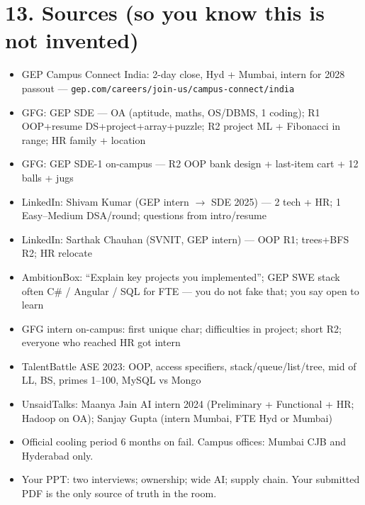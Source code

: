 \documentclass[a4paper,9.5pt]{extarticle}
\begin{document}
\section{13. Sources (so you know this is not invented)}
\begin{itemize}
  \item GEP Campus Connect India: 2-day close, Hyd + Mumbai, intern for 2028 passout --- \texttt{gep.com/careers/join-us/campus-connect/india}
  \item GFG: GEP SDE --- OA (aptitude, maths, OS/DBMS, 1 coding); R1 OOP+resume DS+project+array+puzzle; R2 project ML + Fibonacci in range; HR family + location
  \item GFG: GEP SDE-1 on-campus --- R2 OOP bank design + last-item cart + 12 balls + jugs
  \item LinkedIn: Shivam Kumar (GEP intern $\to$ SDE 2025) --- 2 tech + HR; 1 Easy--Medium DSA/round; questions from intro/resume
  \item LinkedIn: Sarthak Chauhan (SVNIT, GEP intern) --- OOP R1; trees+BFS R2; HR relocate
  \item AmbitionBox: ``Explain key projects you implemented''; GEP SWE stack often C\# / Angular / SQL for FTE --- you do not fake that; you say open to learn
  \item GFG intern on-campus: first unique char; difficulties in project; short R2; everyone who reached HR got intern
  \item TalentBattle ASE 2023: OOP, access specifiers, stack/queue/list/tree, mid of LL, BS, primes 1--100, MySQL vs Mongo
  \item UnsaidTalks: Maanya Jain AI intern 2024 (Preliminary + Functional + HR; Hadoop on OA); Sanjay Gupta (intern Mumbai, FTE Hyd or Mumbai)
  \item Official cooling period 6 months on fail. Campus offices: Mumbai CJB and Hyderabad only.
  \item Your PPT: two interviews; ownership; wide AI; supply chain. Your submitted PDF is the only source of truth in the room.
\end{itemize}

\vspace{2mm}
\end{document}
